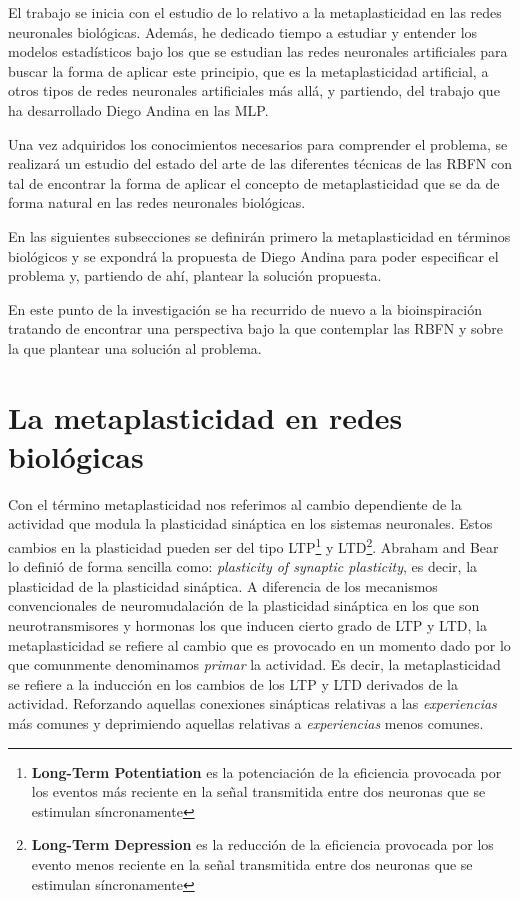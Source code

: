 \documentclass[10pt,a4paper]{report}
\begin{document}
El trabajo se inicia con el estudio de lo relativo a la metaplasticidad en las redes neuronales biológicas. Además, he dedicado tiempo a estudiar y entender los modelos estadísticos bajo los que se estudian las redes neuronales artificiales para buscar la forma de aplicar este principio, que es la metaplasticidad artificial, a otros tipos de redes neuronales artificiales más allá, y partiendo, del trabajo que ha desarrollado Diego Andina en las MLP.

Una vez adquiridos los conocimientos necesarios para comprender el problema, se realizará un estudio del estado del arte de las diferentes técnicas de las RBFN con tal de encontrar la forma de aplicar el concepto de metaplasticidad que se da de forma natural en las redes neuronales biológicas.

En las siguientes subsecciones se definirán primero la metaplasticidad en términos biológicos y se expondrá la propuesta de Diego Andina para poder especificar el problema y, partiendo de ahí, plantear la solución propuesta. 

En este punto de la investigación se ha recurrido de nuevo a la bioinspiración tratando de encontrar una perspectiva bajo la que contemplar las RBFN y sobre la que plantear una solución al problema. 

\section{La metaplasticidad en redes biológicas}
Con el término metaplasticidad nos referimos al cambio dependiente de la actividad que modula la plasticidad sináptica en los sistemas neuronales. Estos cambios en la plasticidad pueden ser del tipo LTP\footnote{\textbf{Long-Term Potentiation} es la potenciación de la eficiencia provocada por los eventos más reciente en la señal transmitida entre dos neuronas que se estimulan síncronamente} y LTD\footnote{\textbf{Long-Term Depression} es la reducción de la eficiencia provocada por los evento menos reciente en la señal transmitida entre dos neuronas que se estimulan síncronamente}. Abraham and Bear lo definió de forma sencilla como: \textit{plasticity of synaptic plasticity}, es decir, la plasticidad de la plasticidad sináptica. A diferencia de los mecanismos convencionales de neuromudalación de la plasticidad sináptica en los que son neurotransmisores y hormonas los que inducen cierto grado de LTP y LTD, la metaplasticidad se refiere al cambio que es provocado en un momento dado por lo que comunmente denominamos \textit{primar} la actividad. Es decir, la metaplasticidad se refiere a la inducción en los cambios de los LTP y LTD derivados de la actividad. Reforzando aquellas conexiones sinápticas relativas a las \textit{experiencias} más comunes y deprimiendo aquellas relativas a \textit{experiencias} menos comunes.
\end{document}
